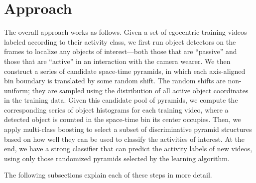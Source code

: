 
\section{Approach}

The overall approach works as follows.  Given a set of egocentric training videos labeled according to their activity class, we first run object detectors on the frames to localize any objects of interest---both those that are ``passive'' and those that are ``active'' in an interaction with the camera wearer. We then construct a series of candidate space-time pyramids, in which each axis-aligned bin boundary is translated by some random shift.  The random shifts are non-uniform; they are sampled using the distribution of all active object coordinates in the training data.  Given this candidate pool of pyramids, we compute the corresponding series of object histograms for each training video, where a detected object is counted in the space-time bin its center occupies.  Then, we apply multi-class boosting to select a subset of discriminative pyramid structures based on how well they can be used to classify the activities of interest.  At the end, we have a strong classifier that can predict the activity labels of new videos, using only those randomized pyramids selected by the learning algorithm.

The following subsections explain each of these steps in more detail.


